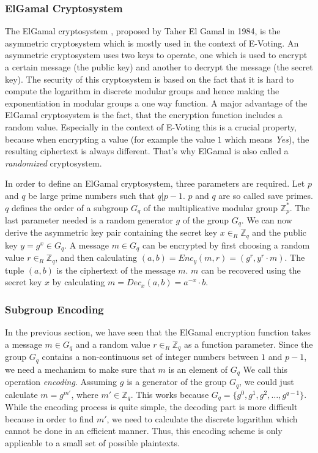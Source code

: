 \documentclass[numbers=noenddot, abstract=on]{scrreprt}
\begin{document}
\subsubsection{ElGamal Cryptosystem}
\label{sec:elgamal}
The ElGamal cryptosystem \cite{EG84}, proposed by Taher El Gamal in 1984, is the
asymmetric cryptosystem which is mostly used in the context of E-Voting. An
asymmetric cryptosystem uses two keys to operate, one which is used to encrypt a
certain message (the public key) and another to decrypt the message (the secret
key). The security of this cryptosystem is based on the fact that it is hard to
compute the logarithm in discrete modular groups and hence making the
exponentiation in modular groups a one way function. A major advantage of the
ElGamal cryptosystem is the fact, that the encryption function includes a random
value. Especially in the context of E-Voting this is a crucial property, because
when encrypting a value (for example the value $1$ which means \textit{Yes}),
the resulting ciphertext is always different. That's why ElGamal is also called
a \textit{randomized} cryptosystem.

In order to define an ElGamal cryptosystem, three parameters are required. Let
$p$ and $q$ be large prime numbers such that $q|p-1$. $p$ and $q$ are so called
save primes. $q$ defines the order of a subgroup $G_q$ of the multiplicative
modular group $\mathbb{Z}^*_p$. The last parameter needed is a random generator
$g$ of the group $G_q$. We can now derive the asymmetric key pair containing the
secret key $x \in_R \mathbb{Z}_q$ and the public key $y=g^x \in G_q$. A message
$m \in G_q$ can be encrypted by first choosing a random value $r \in_R
\mathbb{Z}_q$, and then calculating $(a, b)=Enc_y(m, r)=(g^r, y^r \cdot m)$. The
tuple $(a, b)$ is the ciphertext of the message $m$. $m$ can be recovered using
the secret key $x$ by calculating $m=Dec_x(a, b)=a^{-x} \cdot b$.

\subsubsection{Subgroup Encoding}
\label{sec:subgroupencoding}
In the previous section, we have seen that the ElGamal encryption function takes
a message $m \in G_q$ and a random value $r \in_R \mathbb{Z}_q$ as a function
parameter. Since the group $G_q$ contains a non-continuous set of integer numbers
between $1$ and $p-1$, we need a mechanism to make sure that $m$ is an element
of $G_q$ We call this operation \textit{encoding}.
Assuming $g$ is a generator of the group $G_q$, we could just calculate
$m=g^{m'}$, where $m' \in \mathbb{Z}_q$. This works because $G_q = \{g^0, g^1,
g^2, \ldots, g^{q-1}\}$. While the encoding process is quite simple, the
decoding part is more difficult because in order to find $m'$, we need to
calculate the discrete logarithm which cannot be done in an efficient manner.
Thus, this encoding scheme is only applicable to a small set of possible
plaintexts.
\end{document}
